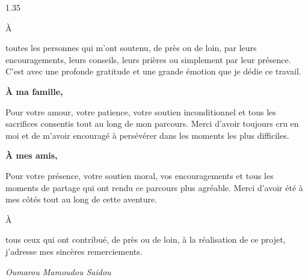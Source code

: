\thispagestyle{empty}


\vspace*{0.5cm}

\noindent
{}


\vspace{1.5cm}

\begin{center}

\begin{spacing}{1.35}

\fontsize{13pt}{22pt}\selectfont

{\fontsize{28pt}{28pt}\selectfont À}

toutes les personnes qui m’ont soutenu, de près ou de loin, par leurs encouragements, leurs conseils, leurs prières ou simplement par leur présence.  
C’est avec une profonde gratitude et une grande émotion que je dédie ce travail.

\vspace{0.7cm}

\textbf{À ma famille,}

Pour votre amour, votre patience, votre soutien inconditionnel et tous les sacrifices consentis tout au long de mon parcours.  
Merci d’avoir toujours cru en moi et de m’avoir encouragé à persévérer dans les moments les plus difficiles.

\vspace{0.7cm}

\textbf{À mes amis,}

Pour votre présence, votre soutien moral, vos encouragements et tous les moments de partage qui ont rendu ce parcours plus agréable.  
Merci d’avoir été à mes côtés tout au long de cette aventure.

\vspace{0.9cm}

{\fontsize{28pt}{28pt}\selectfont À}

tous ceux qui ont contribué, de près ou de loin, à la réalisation de ce projet, j’adresse mes sincères remerciements.

\end{spacing}

\end{center}



\begin{flushright}
\textit{\Large Oumarou Mamoudou Saidou}
\end{flushright}
